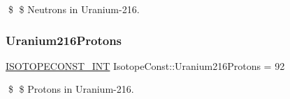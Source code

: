 \$ \$ Neutrons in Uranium-\/216. \mbox{\label{group___isotope_const-_uranium-_u216_gaa842d67da815b4ae48f64603a741bf4d}} 
\subsubsection{\texorpdfstring{Uranium216\+Protons}{Uranium216Protons}}
{\footnotesize\ttfamily \mbox{\hyperlink{group___isotope_const-_macros_ga5f18360b3e99483a35c32d789e62621c}{I\+S\+O\+T\+O\+P\+E\+C\+O\+N\+S\+T\+\_\+\+I\+NT}} Isotope\+Const\+::\+Uranium216\+Protons = 92}

\$ \$ Protons in Uranium-\/216. 
